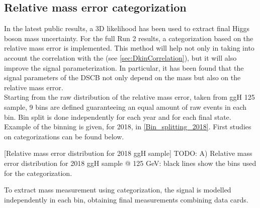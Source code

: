 \subsection{Relative mass error categorization}
\label{sec:SignalParam_N_2D}
In the latest public results, %
a 3D likelihood has been used to extract final Higgs boson mass uncertainty. 
For the full Run 2 results, a categorization based on the relative mass error is implemented.
This method will help not only in taking into account the correlation with the \Dkinbkg (see \ref{sec:DkinCorrelation}), but it will also improve the signal parameterization.
In particular, it has been found that the signal parameters of the DSCB not only depend on the mass but also on the relative mass error.\\
Starting from the raw distribution of the relative mass error, taken from ggH 125 \GeV sample, 
9 bins are defined guaranteeing an equal amount of raw events in each bin. Bin split 
is done independently for each year and for each final state. Example of the binning is given, for 2018, in \cref{Bin_splitting_2018}.
First studies on categorizations can be found below. %
\begin{multiFigure}
    \centering
        [Relative mass error distribution for 2018 ggH sample]
        {TODO:
        \;A) 
        Relative mass error distribution for 2018 ggH sample @ 125 GeV: black lines show 
        the bins used for the categorization.}
    \label{Bin_splitting_2018}
\end{multiFigure}
To extract mass measurement using categorization, the signal is modelled independently in each bin, 
obtaining final measurements combining data cards.

